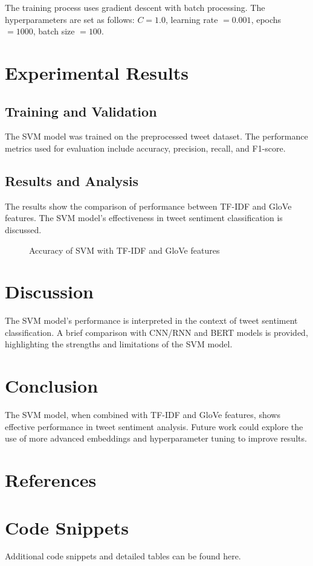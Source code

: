 \documentclass[12pt]{article}
\begin{document}
The training process uses gradient descent with batch processing. The hyperparameters are set as follows: $C=1.0$, learning rate $=0.001$, epochs $=1000$, batch size $=100$.

\section{Experimental Results}

\subsection{Training and Validation}
The SVM model was trained on the preprocessed tweet dataset. The performance metrics used for evaluation include accuracy, precision, recall, and F1-score.

\subsection{Results and Analysis}
The results show the comparison of performance between TF-IDF and GloVe features. The SVM model's effectiveness in tweet sentiment classification is discussed.

\begin{figure}[H]
\centering
\caption{Accuracy of SVM with TF-IDF and GloVe features}
\label{fig:accuracy}
\end{figure}

\section{Discussion}
The SVM model's performance is interpreted in the context of tweet sentiment classification. A brief comparison with CNN/RNN and BERT models is provided, highlighting the strengths and limitations of the SVM model.

\section{Conclusion}
The SVM model, when combined with TF-IDF and GloVe features, shows effective performance in tweet sentiment analysis. Future work could explore the use of more advanced embeddings and hyperparameter tuning to improve results.

\section*{References}



\appendix
\section{Code Snippets}
Additional code snippets and detailed tables can be found here.
\end{document}
